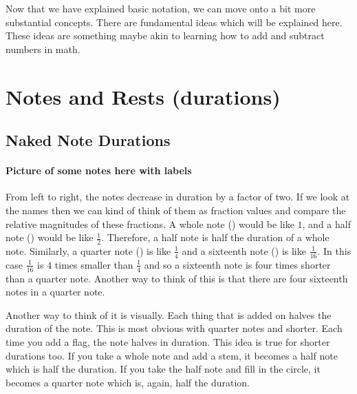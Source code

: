 \documentclass[../OpenAppliedMusicTheory.tex]{subfiles}
\begin{document}
    


    Now that we have explained basic notation, we can move onto a bit more substantial concepts. There are fundamental ideas which will be explained here. These ideas are something maybe akin to learning how to add and subtract numbers in math.

    \section{Notes and Rests (durations)}\label{ch2:duration}
        \subsection{Naked Note Durations}
        \paragraph{Picture of some notes here with labels}
        From left to right, the notes decrease in duration by a factor of two. If we look at the names then we can kind of think of them as fraction values and compare the relative magnitudes of these fractions. A whole note (\musWhole) would be like $1$, and a half note (\musHalf) would be like $\frac{1}{2}$. Therefore, a half note is half the duration of a whole note. Similarly, a quarter note (\musQuarter) is like $\frac{1}{4}$ and a sixteenth note (\musSixteenth) is like $\frac{1}{16}$. In this case $\frac{1}{16}$ is $4$ times smaller than $\frac{1}{4}$ and so a sixteenth note is four times shorter than a quarter note. Another way to think of this is that there are four sixteenth notes in a quarter note.

        Another way to think of it is visually. Each thing that is added on halves the duration of the note. This is most obvious with quarter notes and shorter. Each time you add a flag, the note halves in duration. This idea is true for shorter durations too. If you take a whole note and add a stem, it becomes a half note which is half the duration. If you take the half note and fill in the circle, it becomes a quarter note which is, again, half the duration.
\end{document}
